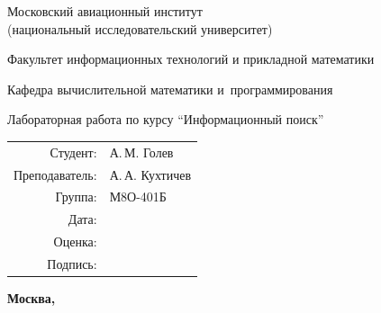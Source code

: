 \begin{titlepage}
\begin{center}
\bfseries

{\Large Московский авиационный институт\\ (национальный исследовательский университет)

}

\vspace{48pt}

{\large Факультет информационных технологий и прикладной математики
}

\vspace{36pt}

{\large Кафедра вычислительной математики и~программирования

}


\vspace{48pt}

Лабораторная работа  по курсу \enquote{Информационный поиск}

\end{center}

\vspace{72pt}

\begin{flushright}
\begin{tabular}{rl}
Студент: & А.\,М. Голев \\
Преподаватель: & А.\,А. Кухтичев \\
Группа: & М8О-401Б \\
Дата: & \\
Оценка: & \\
Подпись: & \\
\end{tabular}
\end{flushright}

\vfill

\begin{center}
\bfseries
Москва, \the\year
\end{center}
\end{titlepage}

\pagebreak
